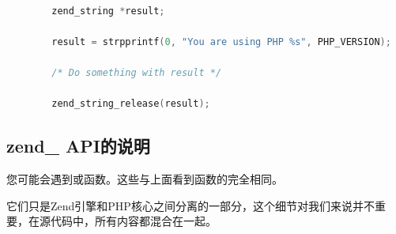 \begin{lstlisting}[language=c]

        zend_string *result;

        result = strpprintf(0, "You are using PHP %s", PHP_VERSION);
        
        /* Do something with result */
        
        zend_string_release(result); 

\end{lstlisting}     


\subsection{zend\_ API的说明}

您可能会遇到或函数。这些与上面看到函数的完全相同。

它们只是Zend引擎和PHP核心之间分离的一部分，这个细节对我们来说并不重要，在源代码中，所有内容都混合在一起。


